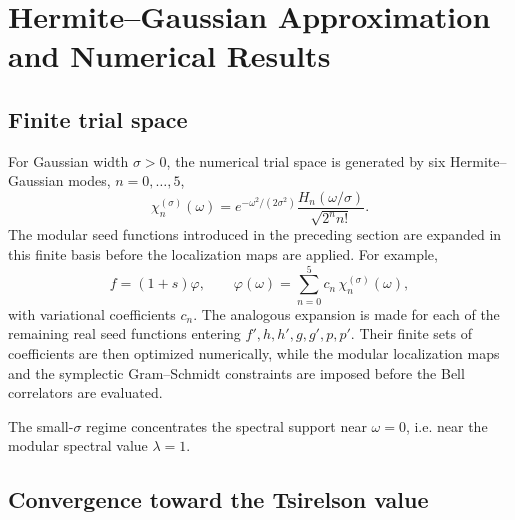 \documentclass[11pt]{article}
\begin{document}
\section{Hermite--Gaussian Approximation and Numerical Results}
\label{sec:numerics}

\subsection{Finite trial space}

For Gaussian width $\sigma>0$, the numerical trial space is generated by six Hermite--Gaussian modes, $n=0,\ldots,5$,
\begin{equation}
 \chi_n^{(\sigma)}(\omega)
 =e^{-\omega^2/(2\sigma^2)}
 \frac{H_n(\omega/\sigma)}{\sqrt{2^n n!}}.
 \label{eq:HG}
\end{equation}
The modular seed functions introduced in the preceding section are expanded in this finite basis before the localization maps are applied. For example,
\begin{equation}
 f=(1+s)\varphi,\qquad
 \varphi(\omega)=\sum_{n=0}^{5}c_n\,\chi_n^{(\sigma)}(\omega),
 \label{eq:phiHGexpansion}
\end{equation}
with variational coefficients $c_n$. The analogous expansion is made for each of the remaining real seed functions entering $f',h,h',g,g',p,p'$. Their finite sets of coefficients are then optimized numerically, while the modular localization maps and the symplectic Gram--Schmidt constraints are imposed before the Bell correlators are evaluated.

The small-$\sigma$ regime concentrates the spectral support near $\omega=0$, i.e. near the modular spectral value $\lambda=1$.

\subsection{Convergence toward the Tsirelson value}
\end{document}
